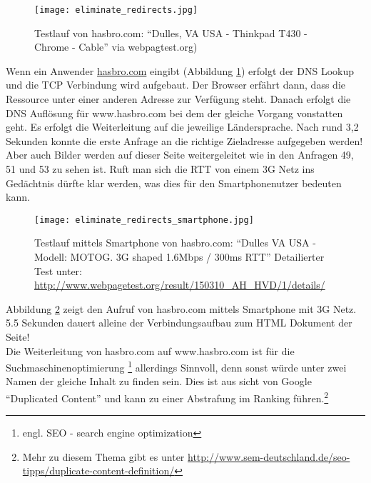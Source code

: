 \begin{itemize}
			\begin{figure}[htbp]
				\begin{center}
					\texttt{[image: eliminate\_redirects.jpg]}
					\caption{Testlauf von hasbro.com: "`Dulles, VA USA - Thinkpad T430 - Chrome - Cable"' via webpagtest.org)}
					\label{fig:eliminate_redirects}
				\end{center}
			\end{figure}
			
			Wenn ein Anwender \url{hasbro.com} eingibt (Abbildung \ref{fig:eliminate_redirects}) erfolgt der DNS Lookup und die TCP Verbindung wird aufgebaut. Der Browser erfährt dann, dass die Ressource unter einer anderen Adresse zur Verfügung steht. Danach erfolgt die DNS Auflösung für www.hasbro.com bei dem der gleiche Vorgang vonstatten geht. Es erfolgt die Weiterleitung auf die jeweilige Ländersprache. Nach rund 3,2 Sekunden konnte die erste Anfrage an die richtige Zieladresse aufgegeben werden! Aber auch Bilder werden auf dieser Seite weitergeleitet wie in den Anfragen 49, 51 und 53 zu sehen ist. Ruft man sich die RTT von einem 3G Netz ins Gedächtnis dürfte klar werden, was dies für den Smartphonenutzer bedeuten kann. \\

			\begin{figure}[htbp]
				\begin{center}
					\texttt{[image: eliminate\_redirects\_smartphone.jpg]}
					\caption{Testlauf mittels Smartphone von hasbro.com: "`Dulles VA USA - Modell: MOTOG. 3G shaped 1.6Mbps / 300ms RTT"' Detailierter Test unter: \url{http://www.webpagetest.org/result/150310_AH_HVD/1/details/}}
					\label{fig:eliminate_redirects_smartphone}
				\end{center}
			\end{figure}

			Abbildung \ref{fig:eliminate_redirects_smartphone} zeigt den Aufruf von hasbro.com mittels Smartphone mit 3G Netz. 5.5 Sekunden dauert alleine der Verbindungsaufbau zum HTML Dokument der Seite!\\

			Die Weiterleitung von hasbro.com auf www.hasbro.com ist für die Suchmaschinenoptimierung \footnote{engl. SEO - search engine optimization} allerdings Sinnvoll, denn sonst würde unter zwei Namen der gleiche Inhalt zu finden sein. Dies ist aus sicht von Google "`Duplicated Content"' und kann zu einer Abstrafung im Ranking führen.\footnote{Mehr zu diesem Thema gibt es unter \url{http://www.sem-deutschland.de/seo-tipps/duplicate-content-definition/}}


\end{itemize}
